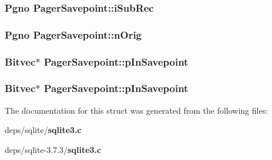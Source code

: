 \subsubsection{\setlength{\rightskip}{0pt plus 5cm}\bf{Pgno} \bf{Pager\-Savepoint::i\-Sub\-Rec}}\label{structPagerSavepoint_05ea740522eed42bd78f8d00b4270798}


\subsubsection{\setlength{\rightskip}{0pt plus 5cm}\bf{Pgno} \bf{Pager\-Savepoint::n\-Orig}}\label{structPagerSavepoint_ffe49649cc87922257eec473320583ec}


\subsubsection{\setlength{\rightskip}{0pt plus 5cm}\bf{Bitvec}$\ast$ \bf{Pager\-Savepoint::p\-In\-Savepoint}}\label{structPagerSavepoint_73c3f3ab563e3bd5e4f05794b6b4d00b}


\subsubsection{\setlength{\rightskip}{0pt plus 5cm}\bf{Bitvec}$\ast$ \bf{Pager\-Savepoint::p\-In\-Savepoint}}\label{structPagerSavepoint_73c3f3ab563e3bd5e4f05794b6b4d00b}




The documentation for this struct was generated from the following files:\begin{CompactItemize}
\item 
deps/sqlite/\bf{sqlite3.c}\item 
deps/sqlite-3.7.3/\bf{sqlite3.c}\end{CompactItemize}

